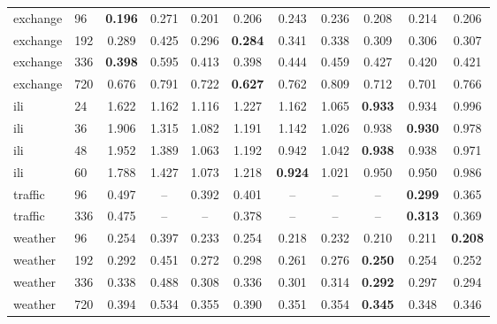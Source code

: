 \begin{tabular}{llccccccccc}
exchange & 96 & \textbf{0.196} & 0.271 & 0.201 & 0.206 & 0.243 & 0.236 & 0.208 & 0.214 & 0.206 \\
exchange & 192 & 0.289 & 0.425 & 0.296 & \textbf{0.284} & 0.341 & 0.338 & 0.309 & 0.306 & 0.307 \\
exchange & 336 & \textbf{0.398} & 0.595 & 0.413 & 0.398 & 0.444 & 0.459 & 0.427 & 0.420 & 0.421 \\
exchange & 720 & 0.676 & 0.791 & 0.722 & \textbf{0.627} & 0.762 & 0.809 & 0.712 & 0.701 & 0.766 \\
ili & 24 & 1.622 & 1.162 & 1.116 & 1.227 & 1.162 & 1.065 & \textbf{0.933} & 0.934 & 0.996 \\
ili & 36 & 1.906 & 1.315 & 1.082 & 1.191 & 1.142 & 1.026 & 0.938 & \textbf{0.930} & 0.978 \\
ili & 48 & 1.952 & 1.389 & 1.063 & 1.192 & 0.942 & 1.042 & \textbf{0.938} & 0.938 & 0.971 \\
ili & 60 & 1.788 & 1.427 & 1.073 & 1.218 & \textbf{0.924} & 1.021 & 0.950 & 0.950 & 0.986 \\
traffic & 96 & 0.497 & -- & 0.392 & 0.401 & -- & -- & -- & \textbf{0.299} & 0.365 \\
traffic & 336 & 0.475 & -- & -- & 0.378 & -- & -- & -- & \textbf{0.313} & 0.369 \\
weather & 96 & 0.254 & 0.397 & 0.233 & 0.254 & 0.218 & 0.232 & 0.210 & 0.211 & \textbf{0.208} \\
weather & 192 & 0.292 & 0.451 & 0.272 & 0.298 & 0.261 & 0.276 & \textbf{0.250} & 0.254 & 0.252 \\
weather & 336 & 0.338 & 0.488 & 0.308 & 0.336 & 0.301 & 0.314 & \textbf{0.292} & 0.297 & 0.294 \\
weather & 720 & 0.394 & 0.534 & 0.355 & 0.390 & 0.351 & 0.354 & \textbf{0.345} & 0.348 & 0.346 \\
\bottomrule
\end{tabular}